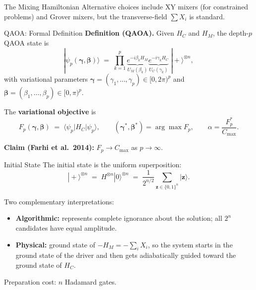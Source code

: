 \documentclass{beamer}
\begin{document}
\begin{frame}
\begin{frame}{The Mixing Hamiltonian}
Alternative choices include XY mixers (for constrained problems) and
Grover mixers, but the transverse-field $\sum X_i$ is standard.
\end{frame}


\begin{frame}{QAOA: Formal Definition}
\textbf{Definition (QAOA).} Given $H_C$ and $H_M$, the depth-$p$ QAOA state is
\[
\boxed{
|\psi_p(\boldsymbol{\gamma},\boldsymbol{\beta})\rangle
\;=\;
\prod_{k=1}^{p}
\underbrace{e^{-i\beta_k H_M}}_{U_M(\beta_k)}
\underbrace{e^{-i\gamma_k H_C}}_{U_C(\gamma_k)}
\;|\!+\rangle^{\otimes n},}
\]
with variational parameters
$\boldsymbol{\gamma}=(\gamma_1,\dots,\gamma_p)\in[0,2\pi)^p$ and
$\boldsymbol{\beta}=(\beta_1,\dots,\beta_p)\in[0,\pi)^p$.

\medskip

The \textbf{variational objective} is
\[
F_p(\boldsymbol{\gamma},\boldsymbol{\beta})
\;=\; \langle\psi_p|H_C|\psi_p\rangle,
\qquad
(\boldsymbol{\gamma}^*,\boldsymbol{\beta}^*)
= \arg\max F_p,
\qquad
\alpha = \frac{F_p^*}{C_{\max}}.
\]

\textbf{Claim (Farhi et al.\ 2014):} $F_p \to C_{\max}$ as $p\to\infty$.
\end{frame}


\begin{frame}{Initial State}
The initial state is the uniform superposition:
\[
|\!+\rangle^{\otimes n}
\;=\; H^{\otimes n}|0\rangle^{\otimes n}
\;=\; \frac{1}{2^{n/2}}\sum_{\mathbf{z}\in\{0,1\}^n}|\mathbf{z}\rangle.
\]

\medskip

Two complementary interpretations:
\begin{itemize}
\item \textbf{Algorithmic:} represents complete ignorance about the
  solution; all $2^n$ candidates have equal amplitude.
\item \textbf{Physical:} ground state of $-H_M = -\sum_i X_i$,
  so the system starts in the ground state of the driver and then
  gets adiabatically guided toward the ground state of $H_C$.
\end{itemize}

\medskip

Preparation cost: $n$ Hadamard gates.
\end{frame}



\end{frame}
\end{document}
